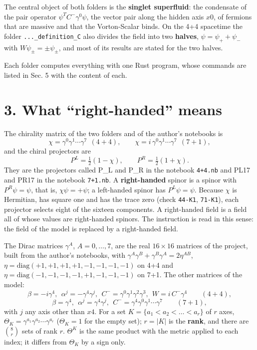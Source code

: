 \documentclass[
  10pt,
]{article}
\begin{document}
The central object of both folders is the \textbf{singlet superfluid}:
the condensate of the pair operator \(\psi^TC^-\gamma^{0}\psi\), the
vector pair along the hidden axis \(x0\), of fermions that are massive
and that the Vorton-Scalar binds. On the 4+4 spacetime the folder
\texttt{...\_definition\_C} also divides the field into two
\textbf{halves}, \(\psi=\psi_++\psi_-\) with \(W\psi_\pm=\pm\psi_\pm\),
and most of its results are stated for the two halves.

Each folder computes everything with one Rust program, whose commands
are listed in Sec. 5 with the content of each.

\hypertarget{what-right-handed-means}{%
\section{3. What ``right-handed'' means}\label{what-right-handed-means}}

The chirality matrix of the two folders and of the author's notebooks is
\[\chi=\gamma^{0}\gamma^{1}\cdots\gamma^{7}\ \ (4+4),\qquad\chi=i\,\gamma^{0}\gamma^{1}\cdots\gamma^{7}\ \ (7+1),\]
and the chiral projectors are
\[P^L=\tfrac12(1-\chi),\qquad P^R=\tfrac12(1+\chi).\] They are the
projectors called P\_L and P\_R in the notebook \texttt{4+4.nb} and PL17
and PR17 in the notebook \texttt{7+1.nb}. A \textbf{right-handed} spinor
is a spinor with \(P^R\psi=\psi\), that is, \(\chi\psi=+\psi\); a
left-handed spinor has \(P^L\psi=\psi\). Because \(\chi\) is Hermitian,
has square one and has the trace zero (check \texttt{44-K1},
\texttt{71-K1}), each projector selects eight of the sixteen components.
A right-handed field is a field all of whose values are right-handed
spinors. The instruction is read in this sense: the field of the model
is replaced by a right-handed field.

The Dirac matrices \(\gamma^A\), \(A=0,\dots,7\), are the real
\(16\times16\) matrices of the project, built from the author's
notebooks, with \(\gamma^A\gamma^B+\gamma^B\gamma^A=2\eta^{AB}\),
\(\eta=\mathrm{diag}(+1,+1,+1,+1,-1,-1,-1,-1)\) on 4+4 and
\(\eta=\mathrm{diag}(-1,-1,-1,-1,+1,-1,-1,-1)\) on 7+1. The other
matrices of the model:
\[\beta=-i\gamma^{4},\ \ \alpha^j=-\gamma^{4}\gamma^{j},\ \ C^-=\gamma^{0}\gamma^{1}\gamma^{2}\gamma^{3},\ \ W=i\,C^-\gamma^{4}\qquad(4+4),\]
\[\beta=\gamma^{4},\ \ \alpha^j=\gamma^{4}\gamma^{j},\ \ C^-=\gamma^{4}\gamma^{0}\gamma^{1}\cdots\gamma^{7}\qquad(7+1),\]
with \(j\) any axis other than \(x4\). For a set
\(K=\{a_1<a_2<\dots<a_r\}\) of \(r\) axes,
\(\Theta_K=\gamma^{a_1}\gamma^{a_2}\cdots\gamma^{a_r}\) (\(\Theta_K=1\)
for the empty set); \(r=|K|\) is the \textbf{rank}, and there are
\(\binom8r\) sets of rank \(r\). \(\Theta^K\) is the same product with
the metric applied to each index; it differs from \(\Theta_K\) by a sign
only.
\end{document}
